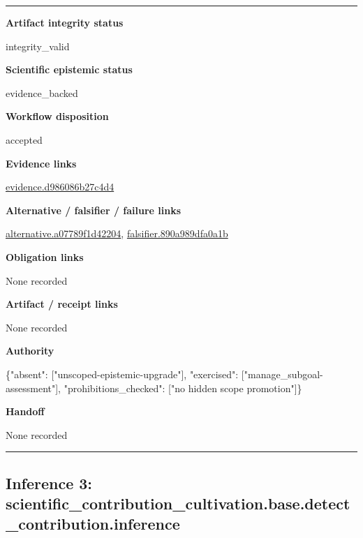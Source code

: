 \documentclass[10pt,a4paper]{article}
\newcommand{\TraceField}[2]{\par\noindent\textbf{#1}\par\noindent #2\par\smallskip}
\newenvironment{TraceDossier}{\par\medskip\noindent\hrule\medskip}{\medskip\hrule\par\medskip}
\begin{document}
\begin{TraceDossier}
\TraceField{Artifact integrity status}{integrity\_\allowbreak{}valid}

\TraceField{Scientific epistemic status}{evidence\_\allowbreak{}backed}

\TraceField{Workflow disposition}{accepted}

\TraceField{Evidence links}{\hyperlink{trace-evidence-9143ffbaafd508602a}{evidence.\allowbreak{}d986086b27\allowbreak{}c4d4}}

\TraceField{Alternative / falsifier / failure links}{\hyperlink{trace-alternative-06983a979b44bd0090}{alternativ\allowbreak{}e.\allowbreak{}a07789f1d4\allowbreak{}2204}, \hyperlink{trace-alternative-cefb2440c924b614bb}{falsifier.\allowbreak{}890a989dfa\allowbreak{}0a1b}}

\TraceField{Obligation links}{None recorded}

\TraceField{Artifact / receipt links}{None recorded}

\TraceField{Authority}{\{"absent":\allowbreak{} ["unscoped\allowbreak{}-\allowbreak{}epistemic-\allowbreak{}upgrade"],\allowbreak{} "exercised\allowbreak{}":\allowbreak{} ["manage\_\allowbreak{}subgoal-\allowbreak{}assessment\allowbreak{}"], "prohibiti\allowbreak{}ons\_\allowbreak{}checked":\allowbreak{} ["no hidden scope promotion"\allowbreak{}]\}}

\TraceField{Handoff}{None recorded}

\end{TraceDossier}
\pagebreak[2]\subsection{Inference 3: scientific\allowbreak{}\_\allowbreak{}contributi\allowbreak{}on\_\allowbreak{}cultivatio\allowbreak{}n.\allowbreak{}base.\allowbreak{}detect\_\allowbreak{}contributi\allowbreak{}on.\allowbreak{}inference}\label{trace-inference-738d4db2b1f7870ff5}
\end{document}
